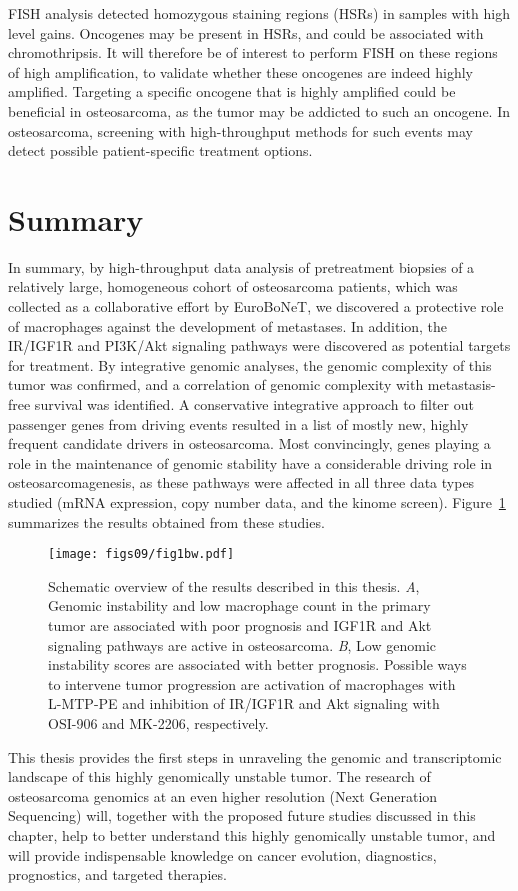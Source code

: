 FISH analysis detected homozygous staining regions (HSRs) in samples with high level gains. Oncogenes may be present in HSRs, and could be associated with chromothripsis. It will therefore be of interest to perform FISH on these regions of high amplification, to validate whether these oncogenes are indeed highly amplified. Targeting a specific oncogene that is highly amplified could be beneficial in osteosarcoma, as the tumor may be addicted to such an oncogene. In osteosarcoma, screening with high\hyp{}throughput methods for such events may detect possible patient\hyp{}specific treatment options.

%
\section{Summary}\label{summary9}
In summary, by high\hyp{}throughput data analysis of pretreatment biopsies of a relatively large, homogeneous cohort of osteosarcoma patients, which was collected as a collaborative effort by EuroBoNeT, we discovered a protective role of macrophages against the development of metastases. In addition, the IR/IGF1R and PI3K/Akt signaling pathways were discovered as potential targets for treatment. By integrative genomic analyses, the genomic complexity of this tumor was confirmed, and a correlation of genomic complexity with metastasis\hyp{}free survival was identified. A conservative integrative approach to filter out passenger genes from driving events resulted in a list of mostly new, highly frequent candidate drivers in osteosarcoma. Most convincingly, genes playing a role in the maintenance of genomic stability have a considerable driving role in osteosarcomagenesis, as these pathways were affected in all three data types studied (mRNA expression, copy number data, and the kinome screen). Figure~\ref{fig9.1} summarizes the results obtained from these studies.
%
\begin{figure}[h] %
	\centering
	\texttt{[image: figs09/fig1bw.pdf]}	%
	\caption{Schematic overview of the results described in this thesis. {\it A}, Genomic instability and low macrophage count in the primary tumor are associated with poor prognosis and IGF1R and Akt signaling pathways are active in osteosarcoma. {\it B}, Low genomic instability scores are associated with better prognosis. Possible ways to intervene tumor progression are activation of macrophages with L-MTP-PE and inhibition of IR/IGF1R and Akt signaling with OSI-906 and MK-2206, respectively.}
	\label{fig9.1}
\end{figure}
%
This thesis provides the first steps in unraveling the genomic and transcriptomic landscape of this highly genomically unstable tumor. The research of osteosarcoma genomics at an even higher resolution (Next Generation Sequencing) will, together with the proposed future studies discussed in this chapter, help to better understand this highly genomically unstable tumor, and will provide indispensable knowledge on cancer evolution, diagnostics, prognostics, and targeted therapies.


\begin{small}
\begin{singlespace}

\end{singlespace}
\end{small}

%